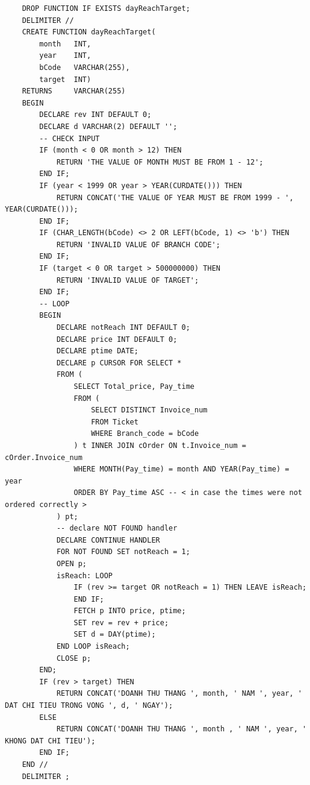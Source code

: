 \begin{verbatim}
    DROP FUNCTION IF EXISTS dayReachTarget;
    DELIMITER //
    CREATE FUNCTION dayReachTarget(
        month   INT,
        year    INT,
        bCode   VARCHAR(255),
        target  INT)
    RETURNS     VARCHAR(255)
    BEGIN
        DECLARE rev INT DEFAULT 0;
        DECLARE d VARCHAR(2) DEFAULT '';
        -- CHECK INPUT
        IF (month < 0 OR month > 12) THEN
            RETURN 'THE VALUE OF MONTH MUST BE FROM 1 - 12';
        END IF;
        IF (year < 1999 OR year > YEAR(CURDATE())) THEN
            RETURN CONCAT('THE VALUE OF YEAR MUST BE FROM 1999 - ', YEAR(CURDATE()));
        END IF;
        IF (CHAR_LENGTH(bCode) <> 2 OR LEFT(bCode, 1) <> 'b') THEN
            RETURN 'INVALID VALUE OF BRANCH CODE';
        END IF;
        IF (target < 0 OR target > 500000000) THEN
            RETURN 'INVALID VALUE OF TARGET';
        END IF;
        -- LOOP
        BEGIN
            DECLARE notReach INT DEFAULT 0;
            DECLARE price INT DEFAULT 0;
            DECLARE ptime DATE;
            DECLARE p CURSOR FOR SELECT *
            FROM (
                SELECT Total_price, Pay_time
                FROM (
                    SELECT DISTINCT Invoice_num
                    FROM Ticket
                    WHERE Branch_code = bCode
                ) t INNER JOIN cOrder ON t.Invoice_num = cOrder.Invoice_num
                WHERE MONTH(Pay_time) = month AND YEAR(Pay_time) = year
                ORDER BY Pay_time ASC -- < in case the times were not ordered correctly >
            ) pt;
            -- declare NOT FOUND handler
            DECLARE CONTINUE HANDLER 
            FOR NOT FOUND SET notReach = 1;
            OPEN p;
            isReach: LOOP
                IF (rev >= target OR notReach = 1) THEN LEAVE isReach;
                END IF;
                FETCH p INTO price, ptime;
                SET rev = rev + price;
                SET d = DAY(ptime);
            END LOOP isReach;
            CLOSE p;
        END;
        IF (rev > target) THEN 
            RETURN CONCAT('DOANH THU THANG ', month, ' NAM ', year, ' DAT CHI TIEU TRONG VONG ', d, ' NGAY');
        ELSE 
            RETURN CONCAT('DOANH THU THANG ', month , ' NAM ', year, ' KHONG DAT CHI TIEU');
        END IF;
    END //
    DELIMITER ;
\end{verbatim} 

